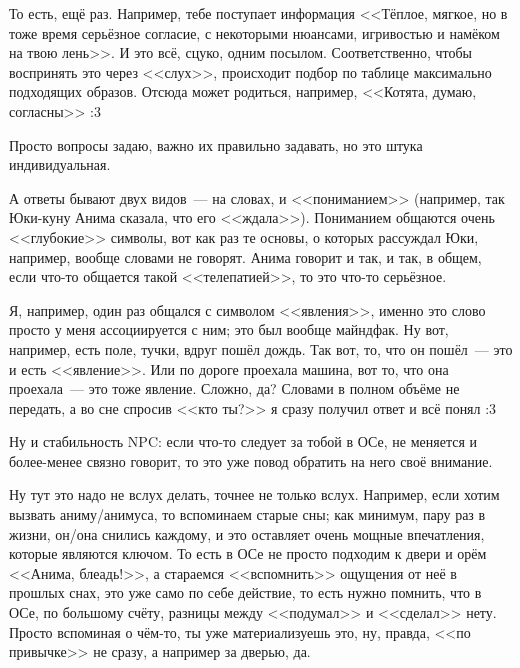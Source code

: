 \documentclass[a4paper,14pt,oneside]{memoir}
\begin{document}
То есть, ещё раз. Например, тебе поступает информация <<Тёплое, мягкое, но в тоже время серьёзное согласие, с некоторыми нюансами, игривостью и намёком на твою лень>>. 
И это всё, сцуко, одним посылом. Соответственно, чтобы воспринять это через <<слух>>, происходит подбор по таблице максимально подходящих образов. Отсюда может родиться, например, <<Котята, думаю, согласны>> :3

\medskip


Просто вопросы задаю, важно их правильно задавать, но это штука индивидуальная. 

А ответы бывают двух видов~--- на словах, и <<пониманием>> (например, так Юки-куну Анима сказала, что его <<ждала>>). Пониманием общаются очень <<глубокие>> символы, вот как раз те основы, о которых рассуждал Юки, например, вообще словами не говорят. Анима говорит и так, и так, в общем, если что-то общается такой <<телепатией>>, то это что-то серьёзное.
 
Я, например, один раз общался с символом <<явления>>, именно это слово просто у меня ассоциируется с ним; это был вообще майндфак. Ну вот, например, есть поле, тучки, вдруг пошёл дождь. Так вот, то, что он пошёл~--- это и есть <<явление>>. Или по дороге проехала машина, вот то, что она проехала~--- это тоже явление. Сложно, да? Словами в полном объёме не передать, а во сне спросив <<кто ты?>> я сразу получил ответ и всё понял :3

Ну и стабильность NPC: если что-то следует за тобой в ОСе, не меняется и более-менее связно говорит, то это уже повод обратить на него своё внимание. 

\medskip


\medskip
Ну тут это надо не вслух делать, точнее не только вслух. На\-при\-мер, если хотим вызвать аниму/анимуса, то вспоминаем старые сны; как минимум, пару раз в жизни, он/она снились каждому, и это оставляет очень мощные впечатления, которые являются ключом. То есть в ОСе не просто подходим к двери и орём <<Анима, блеадь!>>, а стараемся <<вспомнить>> ощущения от неё в прошлых снах, это уже само по себе действие, то есть нужно помнить, что в ОСе, по большому счёту, разницы между <<подумал>> и <<сделал>> нету. Просто вспоминая о чём-то, ты уже материализуешь это, ну, правда, <<по привычке>> не сразу, а например за дверью, да. 
\end{document}
